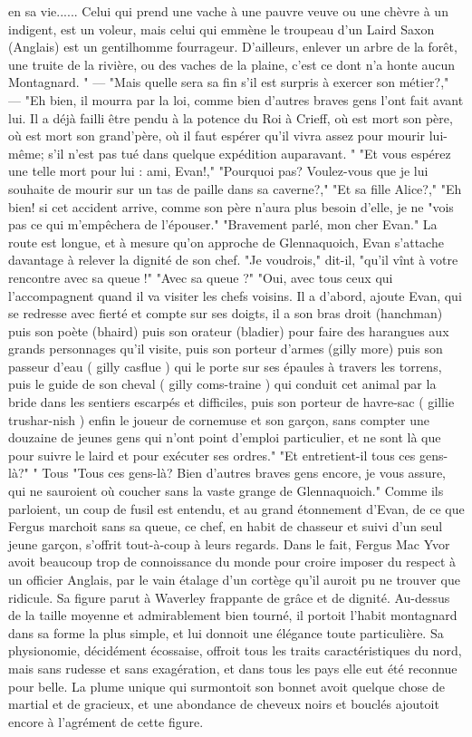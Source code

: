 en sa vie...... Celui qui prend une vache à
une pauvre veuve ou une chèvre à un indigent, est un voleur, mais celui qui emmène le troupeau d’un Laird Saxon (Anglais) est un gentilhomme fourrageur. D’ailleurs, enlever un arbre de la forêt, une
truite de la rivière, ou des vaches de la plaine, c’est ce dont n’a honte aucun Montagnard. "
— "Mais quelle sera sa fin s’il est surpris à exercer son métier?,"
— "Eh bien, il mourra par la loi, comme bien d’autres braves gens l’ont fait avant lui. Il a déjà failli être pendu à la potence du Roi à Crieff, où est mort son père, où est mort son grand’père, où il faut espérer qu’il vivra assez pour mourir lui-même; s’il n’est pas tué dans quelque expédition auparavant. "
"Et vous espérez une telle mort pour lui : ami, Evan!,"
"Pourquoi pas? Voulez-vous que je lui souhaite de mourir sur un tas de paille dans sa caverne?,"
"Et sa fille Alice?,"
"Eh bien! si cet accident arrive, comme
son père n’aura plus besoin d’elle, je ne\setcounter{page}{112} "vois pas ce qui m'empêchera de l'épouser."
"Bravement parlé, mon cher Evan."
La route est longue, et à mesure qu'on approche de Glennaquoich, Evan s'attache davantage à relever la dignité de son chef.
"Je voudrois," dit-il, "qu'il vînt à votre rencontre avec sa queue !"
"Avec sa queue ?"
"Oui, avec tous ceux qui l'accompagnent quand il va visiter les chefs voisins. Il a d'abord, ajoute Evan, qui se redresse avec fierté et compte sur ses doigts, il a son bras droit (hanchman) puis son poète (bhaird) puis son orateur (bladier) pour faire des harangues aux grands personnages qu'il visite, puis son porteur d'armes (gilly more) puis son passeur d'eau ( gilly casflue ) qui le porte sur ses épaules à travers les torrens, puis le guide de son cheval ( gilly coms-traine ) qui conduit cet animal par la bride dans les sentiers escarpés et difficiles, puis son porteur de havre-sac ( gillie trushar-nish ) enfin le joueur de cornemuse et son garçon, sans compter une douzaine de jeunes gens qui n'ont point d'emploi particulier, et ne sont là que pour suivre le laird et pour exécuter ses ordres."
"Et entretient-il tous ces gens-là?"
" Tous\setcounter{page}{113} "Tous ces gens-là? Bien d'autres braves gens encore, je vous assure, qui ne sauroient où coucher sans la vaste grange de Glennaquoich."
Comme ils parloient, un coup de fusil est entendu, et au grand étonnement d'Evan, de ce que Fergus marchoit sans sa queue, ce chef, en habit de chasseur et suivi d'un seul jeune garçon, s'offrit tout-à-coup à leurs regards.
Dans le fait, Fergus Mac Yvor avoit beaucoup trop de connoissance du monde pour croire imposer du respect à un officier Anglais, par le vain étalage d'un cortège qu'il auroit pu ne trouver que ridicule. Sa figure parut à Waverley frappante de grâce et de dignité. Au-dessus de la taille moyenne et admirablement bien tourné, il portoit l'habit montagnard dans sa forme la plus simple, et lui donnoit une élégance toute particulière. Sa physionomie, décidément écossaise, offroit tous les traits caractéristiques du nord, mais sans rudesse et sans exagération, et dans tous les pays elle eut été reconnue pour belle. La plume unique qui surmontoit son bonnet avoit quelque chose de martial et de gracieux, et une abondance\setcounter{page}{114} de cheveux noirs et bouclés ajoutoit encore à l'agrément de cette figure.
